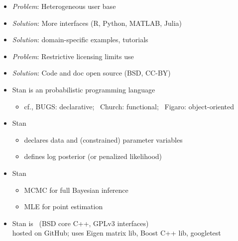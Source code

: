 \documentclass[10pt]{report}
\newcommand{\sld}[1]{\newpage{\noindent\LARGE \ \ \
    \textcolor{MidnightBlue}{\bfseries #1}}\vspace*{4pt}}
\newcommand{\myemph}[1]{{\color{MidnightBlue}{\bfseries #1}}}
\begin{document}
\sld{Why? (continued)}
\begin{itemize}
\item {\slshape Problem}:  Heterogeneous user base
\item {\slshape Solution}: More interfaces (R, Python, MATLAB, Julia)
\item {\slshape Solution}:  domain-specific examples, tutorials
\vspace*{8pt}
\item {\slshape Problem}:  Restrictive licensing limits use
\item {\slshape Solution}: Code and doc open source
(BSD, CC-BY)
\end{itemize}

\sld{What is Stan?}

\begin{itemize}
\item Stan is an \myemph{imperative} probabilistic programming language
  \vspace*{-12pt}
  \begin{itemize}\footnotesize
  \item  cf., BUGS: declarative; \ Church: functional; \ Figaro: object-oriented
  \end{itemize}
\item Stan \myemph{program}
  \vspace*{-4pt}
  \begin{itemize}\small
  \item declares data and (constrained) parameter variables
  \item defines log posterior (or penalized likelihood)
  \end{itemize}
\item Stan \myemph{inference}
  \vspace*{-4pt}
  \begin{itemize}\small
  \item MCMC for full Bayesian inference
  \item MLE for point estimation
  \end{itemize}
\item Stan is \myemph{open source} \ {\footnotesize (BSD core C++, GPLv3 interfaces)}
  \\
  {\footnotesize hosted on GitHub; uses Eigen matrix lib, Boost C++ lib, googletest}
\end{itemize}
\end{document}
